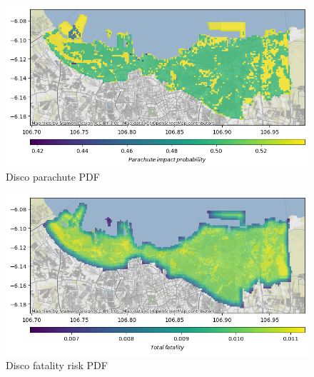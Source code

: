 \documentclass[12pt]{report}
\begin{document}
        \begin{figure}[H]
            \centering
            \includegraphics[width=\textwidth]{Plot/parrot/parachute_pdf.png}
            \caption{Disco parachute PDF}
        \end{figure}
        \begin{figure}[H]
            \centering
            \includegraphics[width=\textwidth]{Plot/parrot/total_fatality-pdf.png}
            \caption{Disco fatality risk PDF}
        \end{figure}
\end{document}
